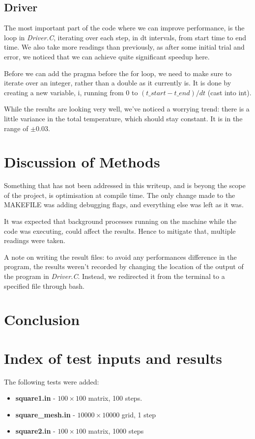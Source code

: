 \documentclass[11pt,journal]{IEEEtran}
\begin{document}
	\subsection{Driver}
	The most important part of the code where we can improve performance, is the loop in \emph{Driver.C}, iterating over each step, in dt intervals, from start time to end time. We also take more readings than previously, as after some initial trial and error, we noticed that we can achieve quite significant speedup here.
	
	Before we can add the pragma before the for loop, we need to make sure to iterate over an integer, rather than a double as it currently is. It is done by creating a new variable, i, running from 0 to $(t\_start - t\_end) / dt$ (cast into int).
	
	While the results are looking very well, we've noticed a worrying trend: there is a little variance in the total temperature, which should stay constant. It is in the range of $\pm 0.03$.
	
	\section{Discussion of Methods}
	Something that has not been addressed in this writeup, and is beyong the scope of the project, is optimisation at compile time. The only change made to the MAKEFILE was adding debugging flags, and everything else was left as it was.
	
	It was expected that background processes running on the machine while the code was executing, could affect the results. Hence to mitigate that, multiple readings were taken.
	
	A note on writing the result files: to avoid any performances difference in the program, the results weren't recorded by changing the location of the output of the program in \emph{Driver.C}. Instead, we redirected it from the terminal to a specified file through bash.
	
	\section{Conclusion}
	
	
	
	
		
		
	\appendices
	\section{Index of test inputs and results}
	The following tests were added:
	\begin{itemize}
		\item \textbf{square1.in} - $100 \times 100$ matrix, 100 steps.
		\item \textbf{square\_mesh.in} - $10000 \times 10000$ grid, 1 step
		\item \textbf{square2.in} - $100 \times 100$ matrix, 1000 steps
	\end{itemize}
	
\end{document}
